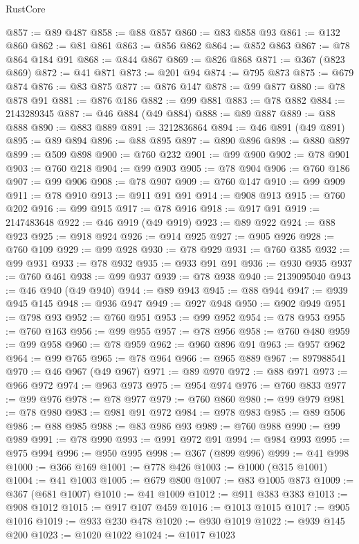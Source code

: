 \begin{lexlean}{RustCore}
\begin{coremodule}
@857 := @89 @487
@858 := @88 @857
@860 := @83 @858 @93
@861 := @132 @860
@862 := @81 @861
@863 := @856 @862
@864 := @852 @863
@867 := @78 @864 @184 @91
@868 := @844 @867
@869 := @826 @868
@871 := @367 (@823 @869)
@872 := @41 @871
@873 := @201 @94
@874 := @795 @873
@875 := @679 @874
@876 := @83 @875
@877 := @876 @147
@878 := @99 @877
@880 := @78 @878 @91
@881 := @876 @186
@882 := @99 @881
@883 := @78 @882
@884 := 2143289345
@887 := @46 @884 (@49 @884)
@888 := @89 @887
@889 := @88 @888
@890 := @883 @889
@891 := 3212836864
@894 := @46 @891 (@49 @891)
@895 := @89 @894
@896 := @88 @895
@897 := @890 @896
@898 := @880 @897
@899 := @509 @898
@900 := @760 @232
@901 := @99 @900
@902 := @78 @901
@903 := @760 @218
@904 := @99 @903
@905 := @78 @904
@906 := @760 @186
@907 := @99 @906
@908 := @78 @907
@909 := @760 @147
@910 := @99 @909
@911 := @78 @910
@913 := @911 @91 @91
@914 := @908 @913
@915 := @760 @202
@916 := @99 @915
@917 := @78 @916
@918 := @917 @91
@919 := 2147483648
@922 := @46 @919 (@49 @919)
@923 := @89 @922
@924 := @88 @923
@925 := @918 @924
@926 := @914 @925
@927 := @905 @926
@928 := @760 @109
@929 := @99 @928
@930 := @78 @929
@931 := @760 @385
@932 := @99 @931
@933 := @78 @932
@935 := @933 @91 @91
@936 := @930 @935
@937 := @760 @461
@938 := @99 @937
@939 := @78 @938
@940 := 2139095040
@943 := @46 @940 (@49 @940)
@944 := @89 @943
@945 := @88 @944
@947 := @939 @945 @145
@948 := @936 @947
@949 := @927 @948
@950 := @902 @949
@951 := @798 @93
@952 := @760 @951
@953 := @99 @952
@954 := @78 @953
@955 := @760 @163
@956 := @99 @955
@957 := @78 @956
@958 := @760 @480
@959 := @99 @958
@960 := @78 @959
@962 := @960 @896 @91
@963 := @957 @962
@964 := @99 @765
@965 := @78 @964
@966 := @965 @889
@967 := 897988541
@970 := @46 @967 (@49 @967)
@971 := @89 @970
@972 := @88 @971
@973 := @966 @972
@974 := @963 @973
@975 := @954 @974
@976 := @760 @833
@977 := @99 @976
@978 := @78 @977
@979 := @760 @860
@980 := @99 @979
@981 := @78 @980
@983 := @981 @91 @972
@984 := @978 @983
@985 := @89 @506
@986 := @88 @985
@988 := @83 @986 @93
@989 := @760 @988
@990 := @99 @989
@991 := @78 @990
@993 := @991 @972 @91
@994 := @984 @993
@995 := @975 @994
@996 := @950 @995
@998 := @367 (@899 @996)
@999 := @41 @998
@1000 := @366 @169
@1001 := @778 @426
@1003 := @1000 (@315 @1001)
@1004 := @41 @1003
@1005 := @679 @800
@1007 := @83 @1005 @873
@1009 := @367 (@681 @1007)
@1010 := @41 @1009
@1012 := @911 @383 @383
@1013 := @908 @1012
@1015 := @917 @107 @459
@1016 := @1013 @1015
@1017 := @905 @1016
@1019 := @933 @230 @478
@1020 := @930 @1019
@1022 := @939 @145 @200
@1023 := @1020 @1022
@1024 := @1017 @1023

\end{coremodule}
\end{lexlean}
